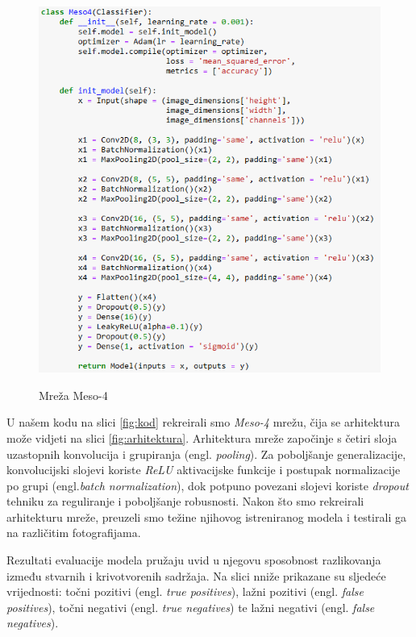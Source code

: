 \documentclass[seminarski, times, utf8]{fer}
\begin{document}
\begin{figure}[H]
\begin{minipage}[b]{0.45\linewidth}
         {\includegraphics[width=\linewidth]{slike/kod.png}}
   \end{minipage}
   
   \caption{Mreža Meso-4}
   \label{fig:mreza}

\end{figure}

U našem kodu na slici \ref{fig:kod} rekreirali smo \textit{Meso-4} mrežu, čija se arhitektura može vidjeti na slici \ref{fig:arhitektura}\cite{mesonet}. Arhitektura mreže započinje s četiri sloja uzastopnih konvolucija i grupiranja (engl. \textit{pooling}). Za poboljšanje generalizacije, konvolucijski slojevi koriste \textit{ReLU} aktivacijske funkcije i postupak normalizacije po grupi (engl.\textit{batch normalization}), dok potpuno povezani slojevi koriste \textit{dropout} tehniku za reguliranje i poboljšanje robusnosti. Nakon što smo rekreirali arhitekturu mreže, preuzeli smo težine njihovog istreniranog modela i testirali ga na različitim fotografijama. 

Rezultati evaluacije modela pružaju uvid u njegovu sposobnost razlikovanja između stvarnih i krivotvorenih sadržaja. Na slici nniže prikazane su sljedeće vrijednosti: točni pozitivi (engl. \textit{true positives}), lažni pozitivi (engl. \textit{false positives}), točni negativi (engl. \textit{true negatives}) te lažni negativi (engl. \textit{false negatives}).
\end{document}
